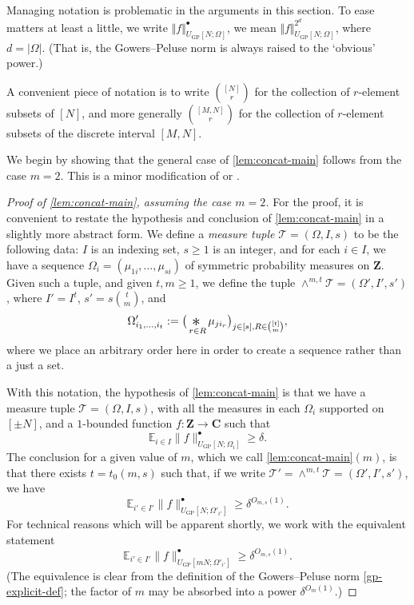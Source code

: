 \documentclass[11pt,reqno]{amsart}
\numberwithin{equation}{section}
\theoremstyle{definition}
\theoremstyle{remark}
\newcommand{\snorm}[1]{\lVert#1\rVert}
\newcommand{\mb}{\mathbb}
\newcommand{\mc}{\mathcal}
\renewcommand{\ge}{\geqslant}
\newcommand\Z{\mathbf{Z}}
\newcommand\C{\mathbf{C}}
\newcommand\E{\mb{E}}
\newcommand\GP{\operatorname{GP}}
\newcommand{\conv}{\mathop{\scalebox{1.5}{\raisebox{-0.2ex}{$\ast$}}}}
\begin{document}
Managing notation is problematic in the arguments in this section. To ease matters at least a little, we write $\Vert f \Vert^{\bullet}_{U_{\GP}[N;\Omega]}$, we mean $\Vert f \Vert^{2^d}_{U_{\GP}[N;\Omega]}$, where $d = |\Omega|$. (That is, the Gowers--Peluse norm is always raised to the `obvious' power.)

A convenient piece of notation is to write $\binom{[N]}{r}$ for the collection of $r$-element subsets of $[N]$, and more generally $\binom{[M, N]}{r}$ for the collection of $r$-element subsets of the discrete interval $[M, N]$. 


We begin by showing that the general case of \cref{lem:concat-main} follows from the case $m = 2$. This is a minor modification of \cite[Corollary 2.5]{kuca} or \cite[Corollary 6.4]{KKL24}.

\begin{proof}[Proof of \cref{lem:concat-main}, assuming the case $m = 2$]
For the proof, it is convenient to restate the hypothesis and conclusion of \cref{lem:concat-main} in a slightly more abstract form. We define a \emph{measure tuple} $\mc{T} = (\Omega, I, s)$ to be the following data: $I$ is an indexing set, $s \ge 1$ is an integer, and for each $i \in I$, we have a sequence $\Omega_i = (\mu_{1i},\dots, \mu_{si})$ of symmetric probability measures on $\Z$. Given such a tuple, and given $t, m \ge 1$, we define the tuple $\wedge^{m, t} \mc{T} = (\Omega', I', s')$, where $I' = I^t$, $s' = s \binom{t}{m}$, and 
\[ \Omega'_{i_1,\dots, i_t} := \big(\conv_{r \in R} \mu_{ji_r}\big)_{j \in [s], R \in \binom{[t]}{m}},\] where we place an arbitrary order here in order to create a sequence rather than a just a set. 

With this notation, the hypothesis of \cref{lem:concat-main} is that we have a measure tuple $\mc{T} = (\Omega, I, s)$, with all the measures in each $\Omega_i$ supported on $[\pm N]$, and a $1$-bounded function $f : \Z \rightarrow \C$ such that \begin{equation}\label{i-dash-hyp} \E_{i\in I}\snorm{f}^{\bullet}_{U_{\GP}[N;\Omega_i]}\ge \delta.\end{equation}
The conclusion for a given value of $m$, which we call \cref{lem:concat-main}$(m)$, is that there exists $t = t_0(m, s)$ such that, if we write $\mc{T}' = \wedge^{m, t}\mc{T} = (\Omega', I', s')$, we have
\[\E_{i' \in I'}\snorm{f}_{ U_{\GP}[N; \Omega'_{i'}]}
^{\bullet}\ge \delta^{O_{m,s}(1)}.\] For technical reasons which will be apparent shortly, we work with the equivalent statement
\begin{equation}\label{i-dash-conclu}\E_{i' \in I'}\snorm{f}_{ U_{\GP}[m N; \Omega'_{i'}]}
^{\bullet}\ge \delta^{O_{m,s}(1)}.\end{equation} 
(The equivalence is clear from the definition of the Gowers--Peluse norm \cref{gp-explicit-def}; the factor of $m$ may be absorbed into a power $\delta^{O_{m}(1)}$.)


\end{proof}
\end{document}
